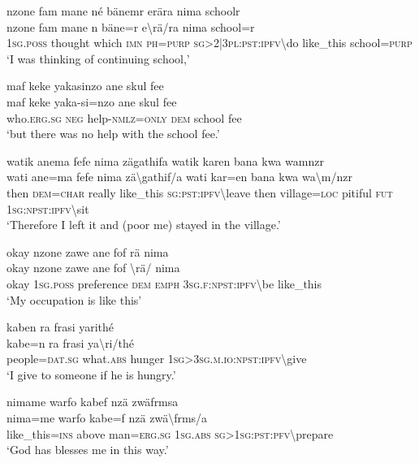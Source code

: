 \ea\label{ex:14:a3216}
nzone fam mane né bänemr erära nima schoolr\\
\gll nzone	fam	mane	n	bäne=r	e{\textbackslash}rä/ra	nima	school=r\\
     1\textsc{sg}.\textsc{poss}	thought	which	\textsc{imn}	\textsc{ph}=\textsc{purp}	\textsc{sg}>2|3\textsc{pl}:\textsc{pst}:\textsc{ipfv}{\textbackslash}do	like\_this	school=\textsc{purp}\\
\glt `I was thinking of continuing school,'
\z

\ea\label{ex:14:a3218}
maf keke yakasinzo ane skul fee\\
\gll maf	keke	yaka-si=nzo	ane	skul	fee\\
     who.\textsc{erg}.\textsc{sg}	\textsc{neg}	help-\textsc{nmlz}=\textsc{only}	\textsc{dem}	school	fee\\
\glt `but there was no help with the school fee.'
\z

\ea\label{ex:14:a3219}
watik anema fefe nima zägathifa watik karen bana kwa wamnzr\\
\gll wati	ane=ma	fefe	nima	zä{\textbackslash}gathif/a	wati	kar=en	bana	kwa	wa{\textbackslash}m/nzr\\
     then	\textsc{dem}=\textsc{char}	really	like\_this	\textsc{sg}:\textsc{pst}:\textsc{ipfv}{\textbackslash}leave	then	village=\textsc{loc}	pitiful	\textsc{fut}	1\textsc{sg}:\textsc{npst}:\textsc{ipfv}{\textbackslash}sit\\
\glt `Therefore I left it and (poor me) stayed in the village.'
\z

\ea\label{ex:14:a3221}
okay nzone zawe ane fof rä nima\\
\gll okay	nzone	zawe	ane	fof	{\textbackslash}rä/	nima\\
     okay	1\textsc{sg}.\textsc{poss}	preference	\textsc{dem}	\textsc{emph}	3\textsc{sg}.\textsc{f}:\textsc{npst}:\textsc{ipfv}{\textbackslash}be	like\_this\\
\glt `My occupation is like this'
\z

\ea\label{ex:14:a3222}
kaben ra frasi yarithé\\
\gll kabe=n	ra	frasi	ya{\textbackslash}ri/thé\\
     people=\textsc{dat}.\textsc{sg}	what.\textsc{abs}	hunger	1\textsc{sg}>3\textsc{sg}.\textsc{m}.\textsc{io}:\textsc{npst}:\textsc{ipfv}{\textbackslash}give\\
\glt `I give to someone if he is hungry.'
\z

\ea\label{ex:14:a3224}
nimame warfo kabef nzä zwäfrmsa\\
\gll nima=me	warfo	kabe=f	nzä	zwä{\textbackslash}frms/a\\
     like\_this=\textsc{ins}	above	man=\textsc{erg}.\textsc{sg}	1\textsc{sg}.\textsc{abs}	\textsc{sg}>1\textsc{sg}:\textsc{pst}:\textsc{pfv}{\textbackslash}prepare\\
\glt `God has blesses me in this way.'
\z

